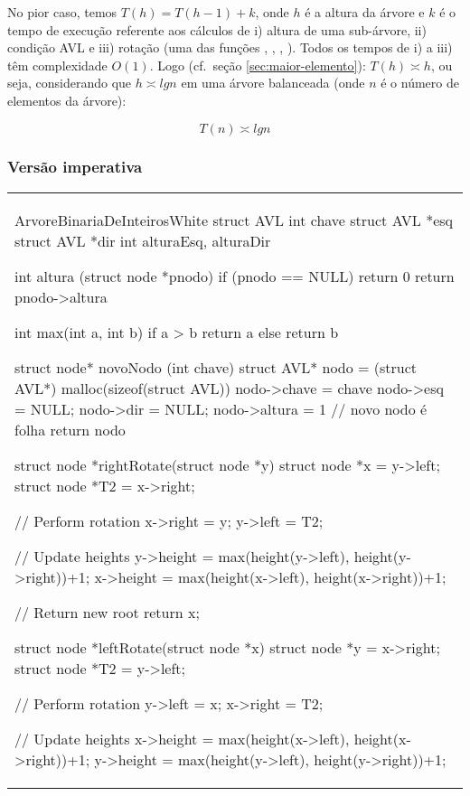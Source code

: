 No pior caso, temos $T(h) = T(h-1) + k$, onde $h$ é a altura da árvore
e $k$ é o tempo de execução referente aos cálculos de i) altura de uma
sub-árvore, ii) condição AVL e iii) rotação (uma das funções
, , , ). Todos os tempos de
i) a iii) têm complexidade $O(1)$. Logo (cf.~seção
\ref{sec:maior-elemento}): $T(h) \asymp h$, ou seja, considerando que
$h \asymp lg n$ em uma árvore balanceada (onde $n$ é o número de
elementos da árvore):

  \[ T(n) \asymp lg n \]

\subsubsection{Versão imperativa}

\begin{center}
\begin{tabular}{l}
\begin{alg}{ArvoreBinariaDeInteiros}{White}
struct AVL
    int chave
    struct AVL *esq
    struct AVL *dir
    int alturaEsq, alturaDir
 
int altura (struct node *pnodo)
    if (pnodo == NULL)
        return 0
    return pnodo->altura
 
int max(int a, int b)
    if a > b return a else return b
 
struct node* novoNodo (int chave)
    struct AVL* nodo = (struct AVL*) malloc(sizeof(struct AVL))
    nodo->chave  = chave
    nodo->esq    = NULL;
    nodo->dir    = NULL;
    nodo->altura = 1 // novo nodo é folha
    return nodo
 
struct node *rightRotate(struct node *y)
    struct node *x = y->left;
    struct node *T2 = x->right;
 
    // Perform rotation
    x->right = y;
    y->left = T2;
 
    // Update heights
    y->height = max(height(y->left), height(y->right))+1;
    x->height = max(height(x->left), height(x->right))+1;
 
    // Return new root
    return x;
 
struct node *leftRotate(struct node *x)
    struct node *y = x->right;
    struct node *T2 = y->left;
 
    // Perform rotation
    y->left = x;
    x->right = T2;
 
    //  Update heights
    x->height = max(height(x->left), height(x->right))+1;
    y->height = max(height(y->left), height(y->right))+1;
 

\end{alg}
\end{tabular}
\end{center}
